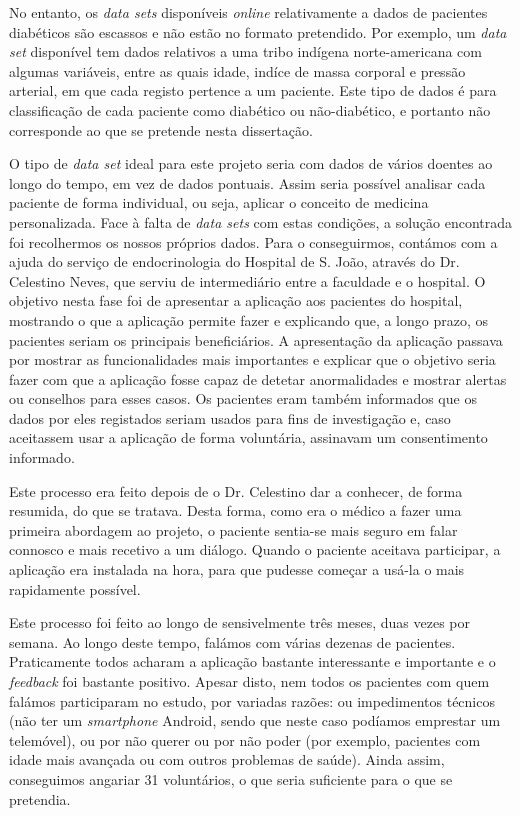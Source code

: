 No entanto, os \textit{data sets} disponíveis \textit{online} relativamente a dados de pacientes diabéticos são escassos e não estão no formato pretendido. Por exemplo, um \textit{data set} disponível tem dados relativos a uma tribo indígena norte-americana com algumas variáveis, entre as quais idade, indíce de massa corporal e pressão arterial, em que cada registo pertence a um paciente. Este tipo de dados é para classificação de cada paciente como diabético ou não-diabético, e portanto não corresponde ao que se pretende nesta dissertação. 

O tipo de \textit{data set} ideal para este projeto seria com dados de vários doentes ao longo do tempo, em vez de dados pontuais. Assim seria possível analisar cada paciente de forma individual, ou seja, aplicar o conceito de medicina personalizada. Face à falta de \textit{data sets} com estas condições, a solução encontrada foi recolhermos os nossos próprios dados. Para o conseguirmos, contámos com a ajuda do serviço de endocrinologia do Hospital de S. João, através do Dr. Celestino Neves, que serviu de intermediário entre a faculdade e o hospital. O objetivo nesta fase foi de apresentar a aplicação aos pacientes do hospital, mostrando o que a aplicação permite fazer e explicando que, a longo prazo, os pacientes seriam os principais beneficiários. A apresentação da aplicação passava por mostrar as funcionalidades mais importantes e explicar que o objetivo seria fazer com que a aplicação fosse capaz de detetar anormalidades e mostrar alertas ou conselhos para esses casos. Os pacientes eram também informados que os dados por eles registados seriam usados para fins de investigação e, caso aceitassem usar a aplicação de forma voluntária, assinavam um consentimento informado. 

Este processo era feito depois de o Dr. Celestino dar a conhecer, de forma resumida, do que se tratava. Desta forma, como era o médico a fazer uma primeira abordagem ao projeto, o paciente sentia-se mais seguro em falar connosco e mais recetivo a um diálogo. Quando o paciente aceitava participar, a aplicação era instalada na hora, para que pudesse começar a usá-la o mais rapidamente possível. 

Este processo foi feito ao longo de sensivelmente três meses, duas vezes por semana. Ao longo deste tempo, falámos com várias dezenas de pacientes. Praticamente todos acharam a aplicação bastante interessante e importante e o \textit{feedback} foi bastante positivo. Apesar disto, nem todos os pacientes com quem falámos participaram no estudo, por variadas razões: ou impedimentos técnicos (não ter um \textit{smartphone} Android, sendo que neste caso podíamos emprestar um telemóvel), ou por não querer ou por não poder (por exemplo, pacientes com idade mais avançada ou com outros problemas de saúde). Ainda assim, conseguimos angariar 31 voluntários, o que seria suficiente para o que se pretendia. 

